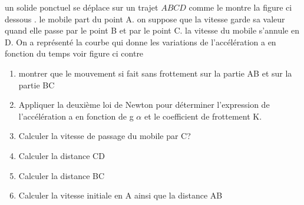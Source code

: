 \documentclass[10pt,a4paper]{article}
\begin{document}
\begin{tcolorbox}[sabour,title=EXERCICE 24]
\begin{minipage}{10cm}



un solide ponctuel se déplace sur un trajet $ABCD$ comme le montre la figure ci dessous . le mobile part  du point A. on suppose que la vitesse garde sa valeur quand elle passe par le point B et par le point C. la vitesse du mobile s'annule en D.
On a représenté la courbe qui donne les variations de l'accélération a en fonction du temps voir figure ci contre 

\begin{enumerate}
\item montrer que le mouvement si fait sans frottement sur la partie AB et sur la partie BC 
\item Appliquer la deuxième loi de Newton pour déterminer l'expression de l'accélération a en fonction de g $\alpha$ et le coefficient de frottement K.
\item Calculer la vitesse de passage du mobile par C? 
\item Calculer la distance CD
\item Calculer la distance BC
\item Calculer la vitesse initiale en A ainsi que la distance AB 

\end{enumerate}
\end{minipage}
\begin{minipage}{8cm}

 \end{minipage}



\end{tcolorbox}
\end{document}
